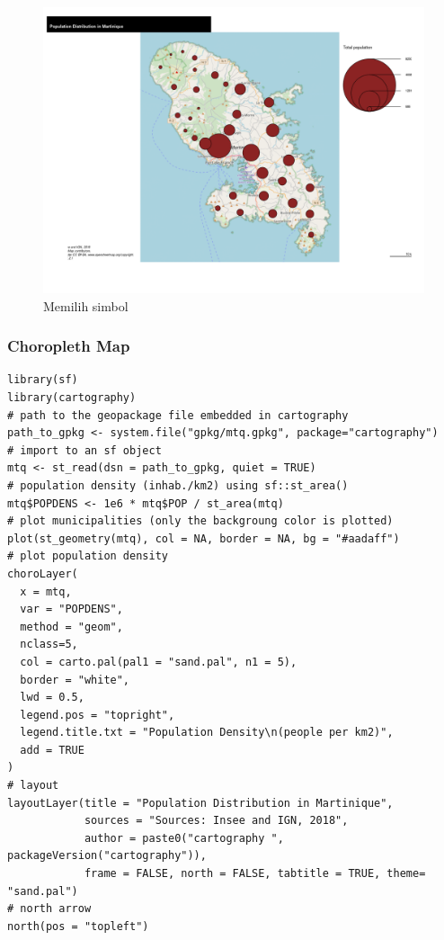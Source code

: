 \documentclass[]{book}
\begin{document}
\begin{figure}

{\centering \includegraphics[width=0.8\linewidth]{images/09/carto1} 

}

\caption{Memilih simbol}\label{fig:carto1}
\end{figure}

\hypertarget{choropleth-map}{%
\subsubsection{Choropleth Map}\label{choropleth-map}}

\begin{verbatim}
library(sf)
library(cartography)
# path to the geopackage file embedded in cartography
path_to_gpkg <- system.file("gpkg/mtq.gpkg", package="cartography")
# import to an sf object
mtq <- st_read(dsn = path_to_gpkg, quiet = TRUE)
# population density (inhab./km2) using sf::st_area()
mtq$POPDENS <- 1e6 * mtq$POP / st_area(mtq)
# plot municipalities (only the backgroung color is plotted)
plot(st_geometry(mtq), col = NA, border = NA, bg = "#aadaff")
# plot population density
choroLayer(
  x = mtq, 
  var = "POPDENS",
  method = "geom",
  nclass=5,
  col = carto.pal(pal1 = "sand.pal", n1 = 5),
  border = "white", 
  lwd = 0.5,
  legend.pos = "topright", 
  legend.title.txt = "Population Density\n(people per km2)",
  add = TRUE
) 
# layout
layoutLayer(title = "Population Distribution in Martinique", 
            sources = "Sources: Insee and IGN, 2018",
            author = paste0("cartography ", packageVersion("cartography")), 
            frame = FALSE, north = FALSE, tabtitle = TRUE, theme= "sand.pal") 
# north arrow
north(pos = "topleft")
\end{verbatim}
\end{document}
